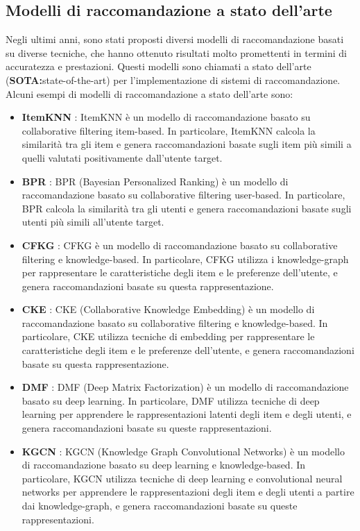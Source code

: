 \subsection{Modelli di raccomandazione a stato dell'arte}
Negli ultimi anni, sono stati proposti diversi modelli di raccomandazione basati su diverse tecniche, che hanno ottenuto risultati molto promettenti in termini di accuratezza e prestazioni. Questi modelli sono chiamati a stato dell'arte (\textbf{SOTA:}state-of-the-art) per l'implementazione di sistemi di raccomandazione. Alcuni esempi di modelli di raccomandazione a stato dell'arte sono:
\begin{itemize}
    \item \textbf{ItemKNN} \cite{ItemKNN}: ItemKNN è un modello di raccomandazione basato su collaborative filtering item-based. In particolare, ItemKNN calcola la similarità tra gli item e genera raccomandazioni basate sugli item più simili a quelli valutati positivamente dall'utente target.
    \item \textbf{BPR} \cite{BPR}: BPR (Bayesian Personalized Ranking) è un modello di raccomandazione basato su collaborative filtering user-based. In particolare, BPR calcola la similarità tra gli utenti e genera raccomandazioni basate sugli utenti più simili all'utente target.
    \item \textbf{CFKG} \cite{CFKG}: CFKG è un modello di raccomandazione basato su collaborative filtering e knowledge-based. In particolare, CFKG utilizza i knowledge-graph per rappresentare le caratteristiche degli item e le preferenze dell'utente, e genera raccomandazioni basate su questa rappresentazione.
    \item \textbf{CKE} \cite{CKE}: CKE (Collaborative Knowledge Embedding) è un modello di raccomandazione basato su collaborative filtering e knowledge-based. In particolare, CKE utilizza tecniche di embedding per rappresentare le caratteristiche degli item e le preferenze dell'utente, e genera raccomandazioni basate su questa rappresentazione.
    \item \textbf{DMF} \cite{DMF}: DMF (Deep Matrix Factorization) è un modello di raccomandazione basato su deep learning. In particolare, DMF utilizza tecniche di deep learning per apprendere le rappresentazioni latenti degli item e degli utenti, e genera raccomandazioni basate su queste rappresentazioni.
    \item \textbf{KGCN} \cite{KGCN}: KGCN (Knowledge Graph Convolutional Networks) è un modello di raccomandazione basato su deep learning e knowledge-based. In particolare, KGCN utilizza tecniche di deep learning e convolutional neural networks per apprendere le rappresentazioni degli item e degli utenti a partire dai knowledge-graph, e genera raccomandazioni basate su queste rappresentazioni.

\end{itemize}
